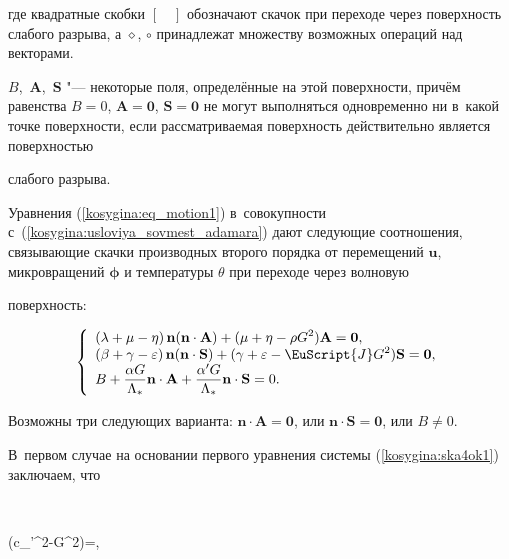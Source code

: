 где квадратные скобки $[\quad]$ обозначают скачок при переходе через поверхность слабого разрыва, а $\diamond$, $\circ$ принадлежат множеству возможных операций над векторами. 

$B$,~$\mathbf{ A}$,~$\mathbf{S}$ "--- некоторые поля, определённые на этой поверхности, причём равенства $B=0$, $\mathbf{ A}=\mathbf{ 0}$, $\mathbf{ S}=\mathbf{ 0}$  не могут выполняться одновременно ни в~какой точке поверхности, если рассматриваемая поверхность действительно является поверхностью

слабого разрыва. 

Уравнения (\ref{kosygina:eq_motion1}) в~совокупности с~(\ref{kosygina:usloviya_sovmest_adamara}) дают следующие соотношения, связывающие скачки производных второго порядка от перемещений $\mathbf{ u}$,  микровращений $\boldsymbol\phi$ и температуры $\theta$ при переходе через волновую

поверхность:

\begin{equation}\label{kosygina:ska4ok1}

\left\{\begin{array}{l}

\displaystyle{\left(\lambda+\mu-\eta\right)\mathbf{ n}(\mathbf{ n}\cdot\mathbf{ A})+(\mu+\eta-\rho G^{2})\mathbf{ A}= \mathbf{ 0},}\\

\displaystyle{\left(\beta+\gamma-\varepsilon\right)\mathbf{ n}(\mathbf{ n}\cdot\mathbf{ S})+(\gamma+\varepsilon-\EuScript{J}G^{2})\mathbf{ S}= \mathbf{ 0},}\\

\displaystyle{B+\frac{\alpha G}{\Lambda_{*}}\mathbf{ n}\cdot\mathbf{

A}+\frac{\alpha' G}{\Lambda_{*}}\mathbf{ n}\cdot\mathbf{ S}=0}.

\end{array}\right.

\end{equation}





Возможны три следующих варианта: $\mathbf{ n}\cdot\mathbf{ A}=\mathbf{ 0}$, или $\mathbf{ n}\cdot\mathbf{ S}=\mathbf{ 0}$, или $B \neq 0.$ 

В~первом случае на основании первого уравнения системы (\ref{kosygina:ska4ok1}) заключаем, что

$$

(c_{\bot}'^2-G^{2})=,

